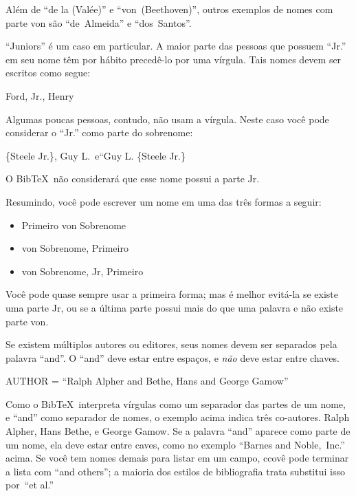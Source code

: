 \documentclass[article,openany]{memoir}
\newenvironment{exemplo}{\begin{center}}{\end{center}}
\begin{document}
Além de ``de la (Valée)'' e ``von~(Beethoven)'', outros exemplos de
nomes com parte von são ``de~Almeida'' e ``dos~Santos''.


``Juniors'' é um caso em particular. A maior parte das pessoas que
possuem ``Jr.'' em seu nome têm por hábito precedê-lo por uma
vírgula. Tais nomes devem ser escritos como segue:

\begin{exemplo}
Ford, Jr., Henry
\end{exemplo}

Algumas poucas pessoas, contudo, não usam a vírgula. Neste caso você
pode considerar o ``Jr.'' como parte do sobrenome:

\begin{exemplo}
\{Steele Jr.\}, Guy L.\quad\ e\quad ``Guy L. \{Steele Jr.\}
\end{exemplo}
O Bib\TeX\ não considerará que esse nome possui a parte Jr.

\smallskip

Resumindo, você pode escrever um nome em uma das três formas a seguir:
\begin{itemize}
\item Primeiro von Sobrenome
\item von  Sobrenome, Primeiro
\item von Sobrenome, Jr, Primeiro
\end{itemize}

Você pode quase sempre usar a primeira forma; mas é melhor evitá-la se
existe uma parte Jr, ou se a última parte possui mais do que uma
palavra e não existe parte von.

Se existem múltiplos autores ou editores, seus nomes devem ser
separados pela palavra ``and''. O ``and'' deve estar entre espaços, e
\emph{não} deve estar entre chaves.

\begin{exemplo}
AUTHOR = ``Ralph Alpher and Bethe, Hans and George Gamow''
\end{exemplo}

Como o Bib\TeX\ interpreta vírgulas como um separador das partes de um
nome, e ``and'' como separador de nomes, o exemplo acima indica três
co-autores. Ralph Alpher, Hans Bethe, e George Gamow. Se a palavra
``and'' aparece como parte de um nome, ela deve estar entre caves,
como no exemplo ``Barnes and Noble,~Inc.'' acima. Se você tem nomes
demais para listar em um campo, ccovê pode terminar a lista com ``and
others''; a maioria dos estilos de bibliografia trata substitui isso
por~``et al.''
\end{document}
